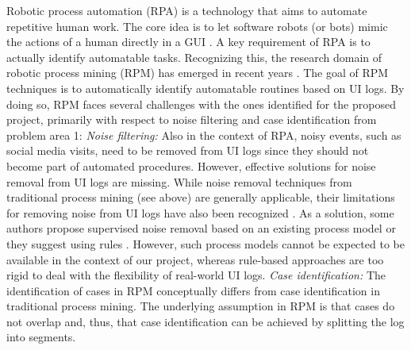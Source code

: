  

 Robotic process automation (RPA) is a technology that aims to automate repetitive human work. The core idea is to let software robots (or bots) mimic the actions of a human directly in a GUI \cite{SYED2020103162}. A key requirement of RPA is to actually identify automatable tasks.  Recognizing this, the research domain of robotic process mining (RPM) has emerged in recent years \cite{leno2021robotic}. The goal of RPM techniques is to automatically identify automatable routines based on UI logs. 
By doing so, RPM faces several challenges with the ones identified for the proposed project, primarily with respect to noise filtering and case identification from problem area 1:   
\vspace{0.2em}
\newline%
\noindent \textit{Noise filtering:} 
Also in the context of RPA, noisy events, such as social media visits, need to be removed from UI logs since they should not become part of automated procedures. However, effective solutions for noise removal from UI logs are missing. While noise removal techniques from traditional process mining (see above) are generally applicable, their limitations for removing noise from UI logs have also been recognized \cite{leno2021robotic}. 
As a solution, some authors propose supervised noise removal based on an existing process model \cite{agostinelli202111} or they suggest using rules \cite{bosco2019discovering,leno2020identifying}. However, such process models cannot be expected to be available in the context of our project, whereas rule-based approaches are too rigid to deal with the flexibility of real-world UI logs.
\vspace{0.2em}
\newline%
\noindent \textit{Case identification:} The identification of cases in RPM conceptually differs from case identification in traditional process mining. The underlying assumption in RPM is that cases do not overlap and, thus, that case identification can be achieved by splitting the log into segments. 
